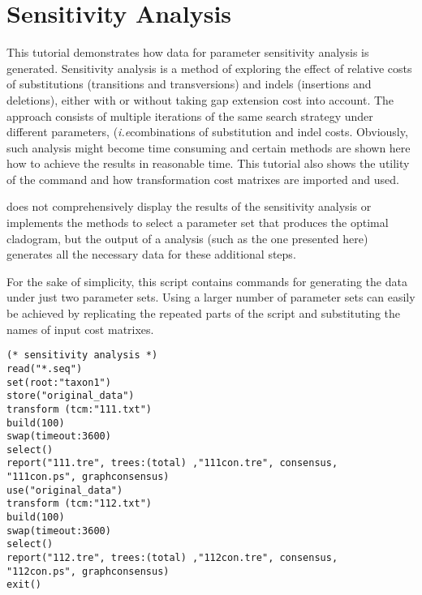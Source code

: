 \section{Sensitivity Analysis}{\label{tutorial 5}}

This tutorial demonstrates how data for parameter sensitivity analysis is generated. Sensitivity analysis \cite{wheeler1995} is a method of exploring the effect of relative costs of substitutions (transitions and transversions) and indels (insertions and deletions), either with or without taking gap extension cost into account. The approach consists of multiple iterations of the same search strategy under different parameters, (\emph{i.e}combinations of substitution and indel costs. Obviously, such analysis might become time consuming and certain methods are shown here how to achieve the results in reasonable time. This tutorial also shows the utility of the command  and how transformation cost matrixes are imported and used.

\poy does not comprehensively display the results of the sensitivity analysis or implements the methods to select a parameter set that produces the optimal cladogram, but the output of a \poy analysis (such as the one presented here) generates all the necessary data for these additional steps.

For the sake of simplicity, this script contains commands for generating the data under just two parameter  sets. Using a larger number of parameter sets can easily be achieved by replicating the repeated parts of the script and substituting the names of input cost matrixes.

\begin{verbatim}
(* sensitivity analysis *)
read("*.seq")
set(root:"taxon1")
store("original_data")
transform (tcm:"111.txt")
build(100)
swap(timeout:3600)
select()
report("111.tre", trees:(total) ,"111con.tre", consensus,
"111con.ps", graphconsensus)
use("original_data")
transform (tcm:"112.txt")
build(100)
swap(timeout:3600)
select()
report("112.tre", trees:(total) ,"112con.tre", consensus,
"112con.ps", graphconsensus)
exit()
\end{verbatim}

